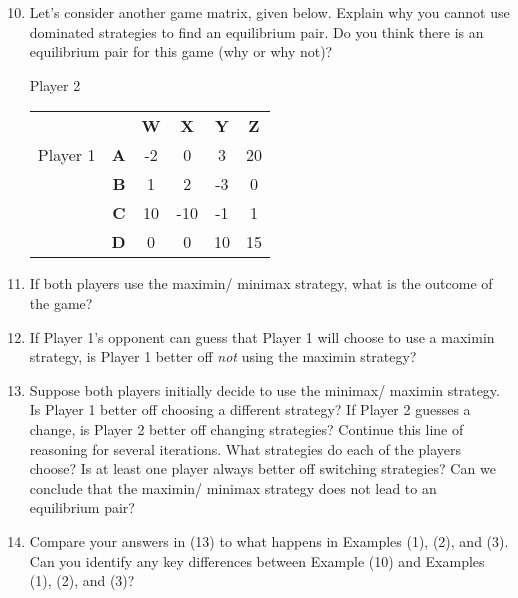 \vspace{.08in}

\begin{enumerate}
\setcounter{enumi}{9}
\item Let's consider another game matrix, given below. Explain why you cannot use dominated strategies to find an equilibrium pair. Do you think there is an equilibrium pair for this game (why or why not)?
\vspace{.1in}

\hspace{1in}Player 2

\begin{tabular}{l|r|c|c|c|c|}\cline{2-6}
&&\textbf{W}&\textbf{X}&\textbf{Y}&\textbf{Z}\\ \cline{2-6}
Player 1&\textbf{A} &-2&0&3&20\\ \cline{2-6}
&\textbf{B} &1&2&-3&0\\ \cline{2-6}
&\textbf{C} &10&-10&-1&1\\ \cline{2-6}
&\textbf{D} &0&0&10&15\\ \cline{2-6}
\end{tabular}
\vspace{.2in}

\item If both players use the maximin/ minimax strategy, what is the outcome of the game? 
\vspace{.08in}

\item If Player 1's opponent can guess that Player 1 will choose to use a maximin strategy, is Player 1 better off {\it not} using the maximin strategy?
\vspace{.08in}

\item Suppose both players initially decide to use the minimax/ maximin strategy. Is Player 1 better off choosing a different strategy? If Player 2 guesses a change, is Player 2 better off changing strategies? Continue this line of reasoning for several iterations. What strategies do each of the players choose? Is at least one player always better off switching strategies? Can we conclude that the maximin/ minimax strategy does not lead to an equilibrium pair?

\vspace{.08in}

\item Compare your answers in (13) to what happens in Examples (1), (2), and (3). Can you identify any key differences between Example (10) and Examples (1), (2), and (3)?
   
\end{enumerate}

 